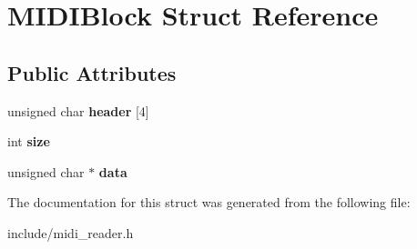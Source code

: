 \hypertarget{structMIDIBlock}{}\section{M\+I\+D\+I\+Block Struct Reference}
\label{structMIDIBlock}
\subsection*{Public Attributes}
\begin{DoxyCompactItemize}
\item 
\mbox{\label{structMIDIBlock_a02e4e52dba7225c6f89d42dc15446793}} 
unsigned char {\bfseries header} \mbox{[}4\mbox{]}
\item 
\mbox{\label{structMIDIBlock_a33e82a075a2c389e4fb4ec3f863cd0b5}} 
int {\bfseries size}
\item 
\mbox{\label{structMIDIBlock_a69c7c7dbb87cd8eb4e2821ccc1aef4fb}} 
unsigned char $\ast$ {\bfseries data}
\end{DoxyCompactItemize}


The documentation for this struct was generated from the following file\+:\begin{DoxyCompactItemize}
\item 
include/midi\+\_\+reader.\+h\end{DoxyCompactItemize}
